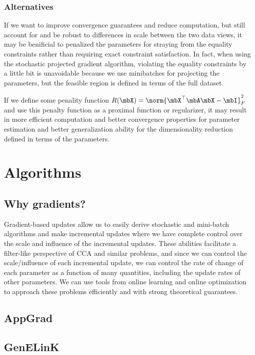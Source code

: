 \documentclass{article}
\begin{document}
	\subsubsection{Alternatives} \label{subsubsec:alternatives}
	If we want to improve convergence guarantees and reduce computation, but still account for and be robust to differences in scale between the two data views, it may be benificial to penalized the parameters for straying from the equality constraints rather than requiring exact constraint satisfaction. In fact, when using the stochastic projected gradient algorithm, violating the equality constraints by a little bit is unavoidable because we use minibatches for projecting the parameters, but the feasible region is defined in terms of the full dataset.
	
	If we define some penality function $R(\mbX) = \norm{\mbX^{\top}\mbA\mbX - \mbI}_F^2$ and use this penalty function as a proximal function or regularizer, it may result in more efficient computation and better convergence properties for parameter estimation and better generalization ability for the dimensionality reduction defined in terms of the parameters.
	
\section{Algorithms} \label{sec:alg}

	\subsection{Why gradients?} \label{subsec:whygradients}
	Gradient-based updates allow us to easily derive stochastic and mini-batch algorithms and make incremental updates where we have complete control over the scale and influence of the incremental updates. These abilities facilitate a filter-like perspective of CCA and similar problems, and since we can control the scale/influence of each incremental update, we can control the rate of change of each parameter as a function of many quantities, including the update rates of other parameters. We can use tools from online learning and online optimization to approach these problems efficiently and with strong theoretical guarantees.

	\subsection{AppGrad} \label{subsec:appgrad}
	
	\subsection{GenELinK} \label{subsec:genelink}
\end{document}
